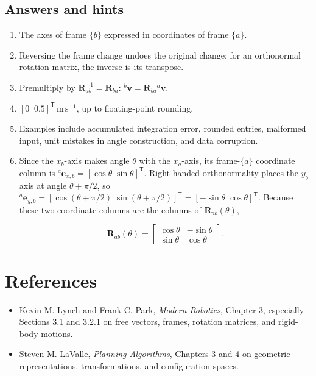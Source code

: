 \documentclass[
  australian,
  12pt,
  letterpaper,
  DIV=11,
  numbers=noendperiod,
  twoside]{scrreprt}
\providecommand{\tightlist}{%
  \setlength{\itemsep}{0pt}\setlength{\parskip}{0pt}}
\begin{document}
\subsection*{Answers and hints}\label{answers-and-hints-5}

\begin{enumerate}
\def\labelenumi{\arabic{enumi}.}
\item
  The axes of frame \(\{b\}\) expressed in coordinates of frame
  \(\{a\}\).
\item
  Reversing the frame change undoes the original change; for an
  orthonormal rotation matrix, the inverse is its transpose.
\item
  Premultiply by \(\mathbf{R}_{ab}^{-1}=\mathbf{R}_{ba}\):
  \({}^{b}\mathbf{v}=\mathbf{R}_{ba}{}^{a}\mathbf{v}\).
\item
  \([0\;\;0.5]^\mathsf{T}\,\mathrm{m\,s^{-1}}\), up to floating-point
  rounding.
\item
  Examples include accumulated integration error, rounded entries,
  malformed input, unit mistakes in angle construction, and data
  corruption.
\item
  Since the \(x_b\)-axis makes angle \(\theta\) with the \(x_a\)-axis,
  its frame-\(\{a\}\) coordinate column is
  \({}^{a}\mathbf e_{x,b}=[\cos\theta\;\sin\theta]^{\mathsf T}\).
  Right-handed orthonormality places the \(y_b\)-axis at angle
  \(\theta+\pi/2\), so
  \({}^{a}\mathbf e_{y,b}=[\cos(\theta+\pi/2)\;\sin(\theta+\pi/2)]^{\mathsf T}=[-\sin\theta\;\cos\theta]^{\mathsf T}\).
  Because these two coordinate columns are the columns of
  \(\mathbf R_{ab}(\theta)\),

  \[
  \mathbf R_{ab}(\theta)
  =
  \begin{bmatrix}
  \cos\theta&-\sin\theta\\
  \sin\theta&\cos\theta
  \end{bmatrix}.
  \]
\end{enumerate}

\section*{References}\label{references-1}


\begin{itemize}
\tightlist
\item
  Kevin M. Lynch and Frank C. Park, \emph{Modern Robotics}, Chapter 3,
  especially Sections 3.1 and 3.2.1 on free vectors, frames, rotation
  matrices, and rigid-body motions.
\item
  Steven M. LaValle, \emph{Planning Algorithms}, Chapters 3 and 4 on
  geometric representations, transformations, and configuration spaces.
\end{itemize}
\end{document}
